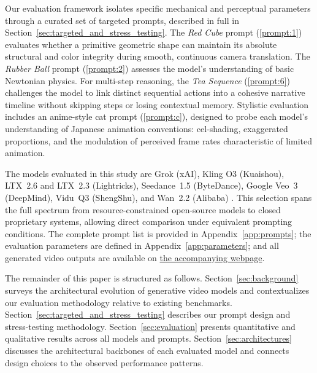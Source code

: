 \documentclass[sigconf]{acmart}
\begin{document}
Our evaluation framework isolates specific mechanical and perceptual
parameters through a curated set of targeted prompts, described in
full in Section~\ref{sec:targeted_and_stress_testing}. The
\textit{Red Cube} prompt (\ref{prompt:1}) evaluates whether a
primitive geometric shape can maintain its absolute structural and color
integrity during smooth, continuous camera translation. The
\textit{Rubber Ball} prompt (\ref{prompt:2}) assesses the
model's understanding of basic Newtonian physics. For multi-step reasoning, the
\textit{Tea Sequence} (\ref{prompt:6}) challenges the model to
link distinct sequential actions into a cohesive narrative timeline
without skipping steps or losing contextual memory. Stylistic
evaluation includes an anime-style cat prompt (\ref{prompt:c}),
designed to probe each model's understanding of Japanese animation
conventions: cel-shading, exaggerated proportions, and the modulation
of perceived frame rates characteristic of limited animation.

The models evaluated in this study are Grok (xAI), Kling O3
(Kuaishou), LTX~2.6 and LTX~2.3 (Lightricks), Seedance~1.5
(ByteDance), Google Veo~3 (DeepMind), Vidu~Q3 (ShengShu), and
Wan~2.2 (Alibaba) \cite{deepmind2024veo, kuaishou2025kling,
    hacohen2026ltx, bytedance2025seedance, xai2025grok, shengshu2024vidu,
    alibaba2025wan}. This selection spans the full spectrum from
resource-constrained open-source models to closed proprietary systems,
allowing direct comparison under equivalent prompting conditions. The
complete prompt list is provided in Appendix~\ref{app:prompts}; the
evaluation parameters are defined in Appendix~\ref{app:parameters};
and all generated video outputs are available on
\href{https://t-cent.github.io/Character-Consistency}{the accompanying
    webpage}.

The remainder of this paper is structured as follows.
Section~\ref{sec:background} surveys the architectural evolution of
generative video models and contextualizes our evaluation methodology
relative to existing benchmarks. Section~\ref{sec:targeted_and_stress_testing}
describes our prompt design and stress-testing methodology.
Section~\ref{sec:evaluation} presents quantitative and qualitative
results across all models and prompts. Section~\ref{sec:architectures}
discusses the architectural backbones of each evaluated model and
connects design choices to the observed performance patterns.
\end{document}
